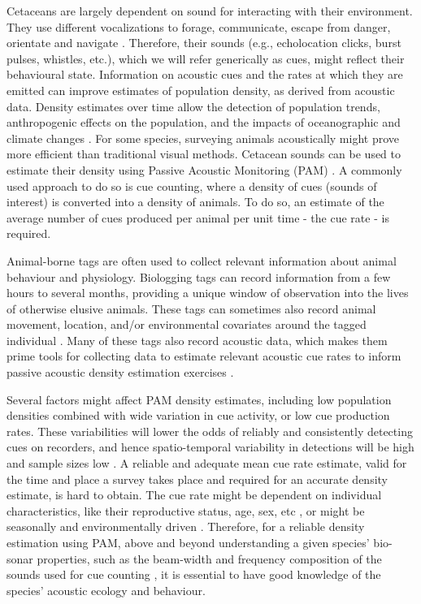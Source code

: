 \documentclass[preprint]{JASA}
\begin{document}
Cetaceans are largely dependent on sound for interacting with their environment. They use different vocalizations to forage, communicate, escape from danger, orientate and navigate \citep{Weilgart_2017}. Therefore, their sounds (e.g., echolocation clicks, burst pulses, whistles, etc.), which we will refer generically as cues, might reflect their behavioural state. Information on acoustic cues and the rates at which they are emitted can improve estimates of population density, as derived from acoustic data. Density estimates over time allow the detection of population trends, anthropogenic effects on the population, and the impacts of oceanographic and climate changes \citep{marques2013}. For some species, surveying animals acoustically might prove more efficient than traditional visual methods. Cetacean sounds can be used to estimate their density using Passive Acoustic Monitoring (PAM) \citep[e.g.][]{Marques_2009, Nowacek_2016, blackwell2018, Warren_2017, Harris_2018}. A commonly used approach to do so is cue counting, where a density of cues (sounds of interest) is converted into a density of animals. To do so, an estimate of the average number of cues produced per animal per unit time - the cue rate - is required.

Animal-borne tags are often used to collect relevant information about animal behaviour and physiology. Biologging tags can record information from a few hours to several months, providing a unique window of observation into the lives of otherwise elusive animals. These tags can sometimes also record animal movement, location, and/or environmental covariates around the tagged individual \citep{Burgess_1998, johnson2003}. Many of these tags also record acoustic data, which makes them prime tools for collecting data to estimate relevant acoustic cue rates to inform passive acoustic density estimation exercises \citep{marques2013}. 

Several factors might affect PAM density estimates, including low population densities combined with wide variation in cue activity, or low cue production rates. These variabilities will lower the odds of reliably and consistently detecting cues on recorders, and hence spatio-temporal variability in detections will be high and sample sizes low \citep{marques2013,blackwell2018,Scheidat_2019}. A reliable and adequate mean cue rate estimate, valid for the time and place a survey takes place and required for an accurate density estimate, is hard to obtain. The cue rate might be dependent on individual characteristics, like their reproductive status, age, sex, etc \citep{Thomas_2012}, or might be seasonally and environmentally driven \citep{ladegaard2021soundscape}. Therefore, for a reliable density estimation using PAM, above and beyond understanding a given species'  bio-sonar properties, such as the beam-width and frequency composition of the sounds used for cue counting \citep{macaulay2020high}, it is essential to have good knowledge of the species’ acoustic ecology and behaviour.
\end{document}
